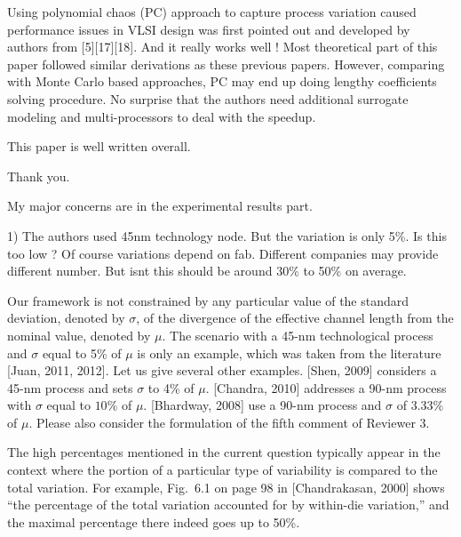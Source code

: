 \begin{reviewer}
Using polynomial chaos (PC) approach to capture process variation caused performance issues in VLSI design was first pointed out and developed by authors from [5][17][18]. And it really works well ! Most theoretical part of this paper followed similar derivations as these previous papers. However, comparing with Monte Carlo based approaches, PC may end up doing  lengthy  coefficients solving procedure. No surprise that the authors need additional surrogate modeling and multi-processors to deal with the speedup.

This paper is well written overall.
\end{reviewer}
\begin{authors}
Thank you.
\end{authors}

\begin{reviewer}
My major concerns are in the experimental results part.

1) The authors used 45nm technology node. But the variation is only 5\%. Is this too low ? Of course variations depend on fab. Different companies may provide different number. But isnt this should be around 30\% to 50\% on average.
\end{reviewer}
\begin{authors}
Our framework is not constrained by any particular value of the standard deviation, denoted by $\sigma$, of the divergence of the effective channel length from the nominal value, denoted by $\mu$.
The scenario with a 45-nm technological process and $\sigma$ equal to 5\% of $\mu$ is only an example, which was taken from the literature [Juan, 2011, 2012].
Let us give several other examples.
[Shen, 2009] considers a 45-nm process and sets $\sigma$ to 4\% of $\mu$.
[Chandra, 2010] addresses a 90-nm process with $\sigma$ equal to $10\%$ of $\mu$.
[Bhardway, 2008] use a 90-nm process and $\sigma$ of 3.33\% of $\mu$.
Please also consider the formulation of the fifth comment of Reviewer 3.

The high percentages mentioned in the current question typically appear in the context where the portion of a particular type of variability is compared to the total variation.
For example, Fig.~6.1 on page 98 in [Chandrakasan, 2000] shows ``the percentage of the total variation accounted for by within-die variation,'' and the maximal percentage there indeed goes up to 50\%.

\end{authors}

